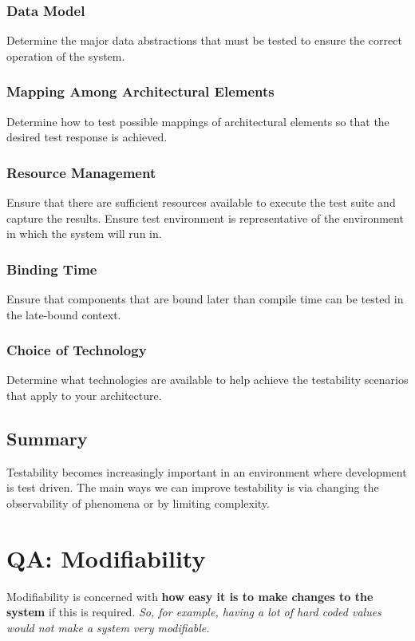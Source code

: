 \documentclass[a4paper]{article}
\begin{document}
\subsubsection{Data Model}
Determine the major data abstractions that must be tested to ensure the correct operation of the system.

\subsubsection{Mapping Among Architectural Elements}
Determine how to test possible mappings of architectural elements so that the desired test response is achieved.

\subsubsection{Resource Management}
Ensure that there are sufficient resources available to execute the test suite and capture the results. 
Ensure test environment is representative of the environment in which the system will run in.

\subsubsection{Binding Time}
Ensure that components that are bound later than compile time can be tested in the late-bound context.

\subsubsection{Choice of Technology}
Determine what technologies are available to help achieve the testability scenarios that apply to your architecture.

\subsection{Summary}
Testability becomes increasingly important in an environment where development is test driven. The main ways we can improve testability is via changing the observability of phenomena or by limiting complexity.

\newpage
\section{QA: Modifiability}
Modifiability is concerned with \textbf{how easy it is to make changes to the system} if this is required. 
\textit{So, for example, having a lot of hard coded values would not make a system very modifiable.}
\end{document}
